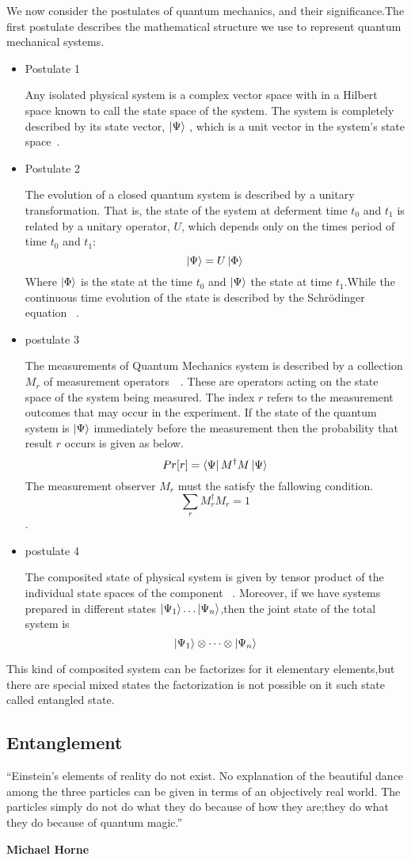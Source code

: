 We now consider the postulates of quantum mechanics, and their significance.The first postulate describes the mathematical structure we use to represent quantum mechanical systems.
\begin{itemize}
\item {Postulate 1}

Any isolated physical system is a complex vector space with in a Hilbert space known to call the state space of the system. The system is completely described by its state vector, $\ket{\Psi}$ , which is a unit vector in the system’s state space~\cite{book:17312}.
\item{Postulate 2}

The evolution of a closed quantum system is described by a unitary transformation. That is, the state of the system at deferment time $t_0$ and $t_1$ is related  by a unitary operator, $U$, which depends only on the times period of time $t_0$ and $t_1$:
$$\ket{\Psi}=U\ket{\Phi}$$
Where $\ket{\Phi}$ is the state at the time $t_0$ and $\ket{\Psi}$ the state at time $t_1$.While the continuous time evolution  of the state is described by the Schrödinger equation ~\cite{book:17312}.
\item{postulate 3}

The measurements of Quantum Mechanics system  is described by a collection ${M_r }$ of measurement operators~\citep{book:17312}~. These are operators acting on the state space of the system being
measured. The index $r $ refers to the measurement outcomes that may occur in the experiment. If the state of the quantum system is $\ket{\Psi}$ immediately before the measurement then the probability that result $r$ occurs is given as below.
$$Pr[r]=\bra{\Psi}M^{\dagger}  M\ket{\Psi}$$ 
The measurement observer ${M_r }$ must the satisfy the fallowing condition.
$$\sum_r M_{r}^{\dagger} M_r=1$$.


\item{postulate 4}

The composited state of physical system is given by  tensor product of the individual state spaces of the component~\citep{book:889079} . Moreover, if we have systems prepared  in different  states $\ket{\Psi_1} \dots \ket{\Psi_n}$,then the joint state of the total system is
$$\ket{\Psi_1}\otimes\dots \otimes\ket{\Psi_n}$$
\end{itemize}
This kind of composited system can be factorizes for it elementary elements,but there are special mixed states the factorization is not possible  on it such state called entangled state.
\subsection{Entanglement}
\begin{center}
“Einstein’s elements of reality do not exist. No explanation of the beautiful dance among the 	three particles can be given in terms of an objectively real world. The particles
simply do not do what they do because of how they are;they do what they do because of quantum magic.”

\end{center}
\begin{flushright}
\textbf{Michael Horne}
\end{flushright}

